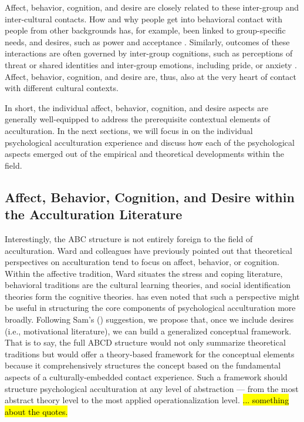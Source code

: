 \documentclass[man, 12pt, a4paper, mask]{apa7}
\begin{document}
Affect, behavior, cognition, and desire are closely related to these inter-group and inter-cultural contacts. How and why people get into behavioral contact with people from other backgrounds has, for example, been linked to group-specific needs, and desires, such as power and acceptance \citep[e.g.,][]{Hassler2021, Shnabel2008a}. Similarly, outcomes of these interactions are often governed by inter-group cognitions, such as perceptions of threat or shared identities \citep[e.g.,][]{Dovidio2017, Stephan2000a} and inter-group emotions, including pride, or anxiety \citep[e.g.,][]{Iyer2008, Stephan1992}. Affect, behavior, cognition, and desire are, thus, also at the very heart of contact with different cultural contexts.

In short, the individual affect, behavior, cognition, and desire aspects are generally well-equipped to address the prerequisite contextual elements of acculturation. In the next sections, we will focus in on the individual psychological acculturation experience and discuss how each of the psychological aspects emerged out of the empirical and theoretical developments within the field. 

\subsection{Affect, Behavior, Cognition, and Desire within the Acculturation Literature}
Interestingly, the ABC structure is not entirely foreign to the field of acculturation. Ward and colleagues \citep{Ward2001, Masgoret2006, Ward2019} have previously pointed out that theoretical perspectives on acculturation tend to focus on affect, behavior, or cognition. Within the affective tradition, Ward situates the stress and coping literature, behavioral traditions are the cultural learning theories, and social identification theories form the cognitive theories. \citet{Sam2006b} has even noted that such a perspective might be useful in structuring the core components of psychological acculturation more broadly. 
Following Sam's (\citeyear{Sam2006b}) suggestion, we propose that, once we include desires (i.e., motivational literature), we can build a generalized conceptual framework. That is to say, the full ABCD structure would not only summarize theoretical traditions but would offer a theory-based framework for the conceptual elements because it comprehensively structures the concept based on the fundamental aspects of a culturally-embedded contact experience. Such a framework should structure psychological acculturation at any level of abstraction --- from the most abstract theory level to the most applied operationalization level. \hl{... something about the quotes.}
\end{document}
